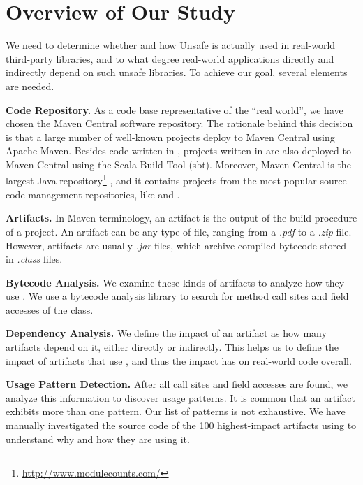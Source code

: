 \section{Overview of Our Study}
\label{sec:unsafe:overview}

We need to determine whether and how Unsafe is actually used in real-world third-party \java{} libraries,
and to what degree real-world applications directly and indirectly depend on such unsafe libraries.
To achieve our goal, several elements are needed.

\textbf{Code Repository.}
As a code base representative of the ``real world'',
we have chosen the Maven Central software repository.
The rationale behind this decision is that a large number of well-known \java{} projects deploy to Maven Central using Apache Maven.
Besides code written in \java{}, projects written in  are also deployed to Maven Central using the Scala Build Tool (sbt).
Moreover, Maven Central is the largest Java repository\footnote{\url{http://www.modulecounts.com/}}
, and it contains projects from the most popular source code management repositories, like \github{} and \sourceforge{}.

\textbf{Artifacts.}
In Maven terminology, an artifact is the output of the build procedure of a project.
An artifact can be any type of file, ranging from a \emph{.pdf} to a \emph{.zip} file.
However, artifacts are usually \emph{.jar} files,
which archive compiled \java{} bytecode stored in \emph{.class} files.

\textbf{Bytecode Analysis.}
We examine these kinds of artifacts to analyze how they use .
We use a bytecode analysis library to search for method call sites and field accesses of the  class.

\textbf{Dependency Analysis.}
We define the impact of an artifact as how many artifacts depend on it,
either directly or indirectly.
This helps us to define the impact of artifacts that use ,
and thus the impact  has on real-world code overall.

\textbf{Usage Pattern Detection.}
After all call sites and field accesses are found,
we analyze this information to discover usage patterns.
It is common that an artifact exhibits more than one pattern.
Our list of patterns is not exhaustive.
We have manually investigated the source code of the 100 highest-impact artifacts using  to understand why and how they are using it.


